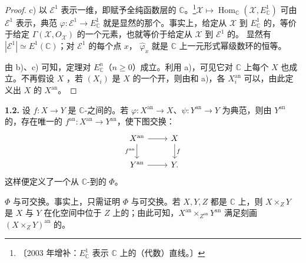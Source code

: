 \begin{proof}
c) 以 $\mathcal E^1$ 表示一维，即赋予全纯函数层的 $\mathbb C$。\footnote{〔2003 年增补：$E^1_{\mathbb C}$ 表示 $\mathbb C$ 上的（代数）直线。〕}$\mathcal X\mapsto\operatorname{Hom}_{\mathbb C}(\mathcal X,E^1_{\mathbb C})$ 可由 $\mathcal E^1$ 表示，典范 $\varphi:\mathcal E^1\to E^1_{\mathbb C}$ 就是显然的那个。事实上，给定从 $\mathcal X$ 到 $E^1_{\mathbb C}$ 的，等价于给定 $\Gamma(\mathcal X,O_{\mathcal X})$ 的一个元素，也就等价于给定从 $\mathcal X$ 到 $\mathcal E^1$ 的。
显然有 $|\mathcal E^1|\simeq E^1(\mathbb C)$；对 $\mathcal E^1$ 的每个点 $x$， $\widehat\varphi_x$ 就是 $\mathbb C$ 上一元形式幂级数环的恒等。

由 b)、c) 可知，定理对 $E^n_{\mathbb C}$（$n\geq0$）成立。利用 a)，可见它对 $\mathbb C$ 上每个 $X$ 也成立。不再假设 $X$ ，若 $(X_i)$ 是 $X$ 的一个开，则由和 a)，各 $X_i^{\mathrm{an}}$ 可以，由此定义出 $X$ 的 $X^{\mathrm{an}}$。
\end{proof}

\textbf{1.2.} 设 $f:X\to Y$ 是 $\mathbb C$-之间的。若 $\varphi:X^{\mathrm{an}}\to X$、$\psi:Y^{\mathrm{an}}\to Y$ 为典范，则由 $Y^{\mathrm{an}}$ 的，存在唯一的 $f^{\mathrm{an}}:X^{\mathrm{an}}\to Y^{\mathrm{an}}$，使下图交换：
\[
\begin{tikzcd}
X^{\mathrm{an}}\arrow[r]\arrow[d,"f^{\mathrm{an}}"']&X\arrow[d,"f"]\\
Y^{\mathrm{an}}\arrow[r]&Y.
\end{tikzcd}
\]
这样便定义了一个从 $\mathbb C$-到的 $\Phi$。

 $\Phi$ 与可交换。事实上，只需证明 $\Phi$ 与可交换。若 $X,Y,Z$ 都是 $\mathbb C$ 上，则 $X\times_ZY$ 是 $X$ 与 $Y$ 在化空间中位于 $Z$ 上的；由此可知，$X^{\mathrm{an}}\times_{Z^{\mathrm{an}}}Y^{\mathrm{an}}$ 满足刻画 $(X\times_ZY)^{\mathrm{an}}$ 的。

